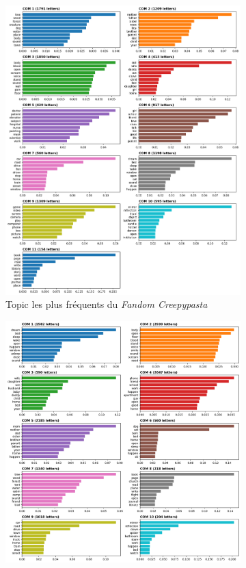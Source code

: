 \documentclass[12pt,a4paper,oneside,titlepage]{book} %
\begin{document}
		\begin{figure}[htbp]
			\centering
			\begin{subfigure}[b]{0.45\textwidth}
				\includegraphics[width=\textwidth]{illustration/tf-idf_topic_fandom.png}
				\caption{Topic les plus fréquents du \emph{Fandom Creepypasta}}
				\label{fig:topic_CP}
			\end{subfigure}
			\hfill
			\begin{subfigure}[b]{0.45\textwidth}
				\includegraphics[width=\textwidth]{illustration/tf-idf_topic_reddit.png}

\end{subfigure}
\end{figure}
\end{document}
